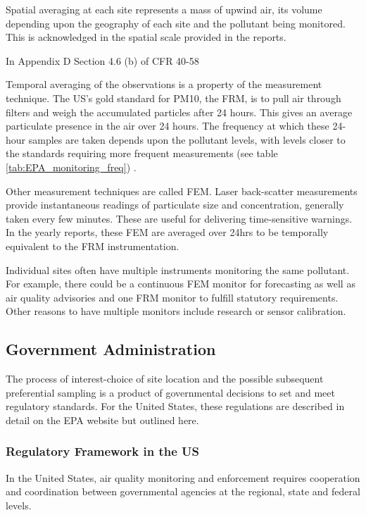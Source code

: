 Spatial averaging at each site represents a mass of upwind air, its volume depending upon the geography of each site and the pollutant being monitored.  This is acknowledged in the spatial scale provided in the reports.   

In Appendix D Section 4.6 (b) of CFR 40-58 %


Temporal averaging of the observations is a property of the measurement technique.  The US's gold standard for \ac{PM10}, the \ac{FRM}, is to pull air through filters and weigh the accumulated particles after 24 hours.  This gives an average particulate presence in the air over 24 hours.  The frequency at which these 24-hour samples are taken depends upon the pollutant levels, with levels closer to the standards requiring more frequent measurements (see table \ref{tab:EPA_monitoring_freq}) 
\citep{CASCAQMD:2015}.

Other measurement techniques are called \ac{FEM}.  Laser back-scatter measurements provide instantaneous readings of particulate size and concentration, generally taken every few minutes.  These are useful for delivering time-sensitive warnings.  In the yearly reports, these \ac {FEM} are averaged over 24hrs to be temporally equivalent to the \ac{FRM} instrumentation.

Individual sites often have multiple instruments monitoring the same pollutant. For example, there could be a continuous \ac{FEM} monitor for forecasting as well as air quality advisories and one \ac{FRM} monitor to fulfill statutory requirements.  Other reasons to have multiple monitors include research or sensor calibration. 



\subsection{Government Administration}
\label{subsec:govtadmin}
The process of interest-choice of site location and the possible subsequent preferential sampling is a product of governmental decisions to set and meet regulatory standards.  For the United States, these regulations are described in detail on the EPA website
but outlined here.

\subsubsection*{Regulatory Framework in the US}
\label{subsubsec:regulation}
In the United States, air quality monitoring and enforcement requires cooperation and coordination between governmental agencies at the regional, state and federal levels.

